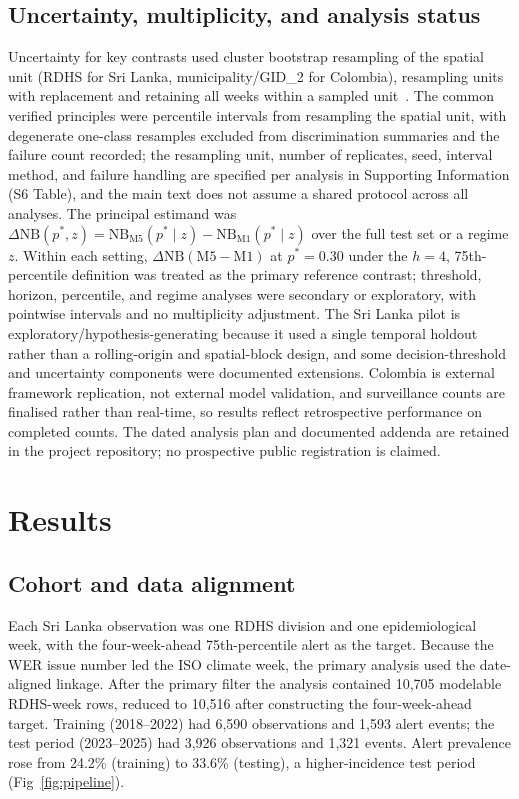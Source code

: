 \documentclass[11pt,a4paper]{article}
\begin{document}
\subsection{Uncertainty, multiplicity, and analysis status}
Uncertainty for key contrasts used cluster bootstrap resampling of the spatial unit (RDHS for Sri Lanka, municipality/GID\_2 for Colombia), resampling units with replacement and retaining all weeks within a sampled unit~\cite{CameronGelbachMiller2008}. The common verified principles were percentile intervals from resampling the spatial unit, with degenerate one-class resamples excluded from discrimination summaries and the failure count recorded; the resampling unit, number of replicates, seed, interval method, and failure handling are specified per analysis in Supporting Information (S6 Table), and the main text does not assume a shared protocol across all analyses. The principal estimand was $\Delta\mathrm{NB}(p^*,z)=\mathrm{NB}_{\mathrm{M5}}(p^*\mid z)-\mathrm{NB}_{\mathrm{M1}}(p^*\mid z)$ over the full test set or a regime $z$. Within each setting, $\Delta\mathrm{NB}(\text{M5}-\text{M1})$ at $p^*=0.30$ under the $h=4$, 75th-percentile definition was treated as the primary reference contrast; threshold, horizon, percentile, and regime analyses were secondary or exploratory, with pointwise intervals and no multiplicity adjustment. The Sri Lanka pilot is exploratory/hypothesis-generating because it used a single temporal holdout rather than a rolling-origin and spatial-block design, and some decision-threshold and uncertainty components were documented extensions. Colombia is external framework replication, not external model validation, and surveillance counts are finalised rather than real-time, so results reflect retrospective performance on completed counts. The dated analysis plan and documented addenda are retained in the project repository; no prospective public registration is claimed.

\section{Results}

\subsection{Cohort and data alignment}
Each Sri Lanka observation was one RDHS division and one epidemiological week, with the four-week-ahead 75th-percentile alert as the target. Because the WER issue number led the ISO climate week, the primary analysis used the date-aligned linkage. After the primary filter the analysis contained 10{,}705 modelable RDHS-week rows, reduced to 10{,}516 after constructing the four-week-ahead target. Training (2018--2022) had 6{,}590 observations and 1{,}593 alert events; the test period (2023--2025) had 3{,}926 observations and 1{,}321 events. Alert prevalence rose from 24.2\% (training) to 33.6\% (testing), a higher-incidence test period (Fig~\ref{fig:pipeline}).
\end{document}
